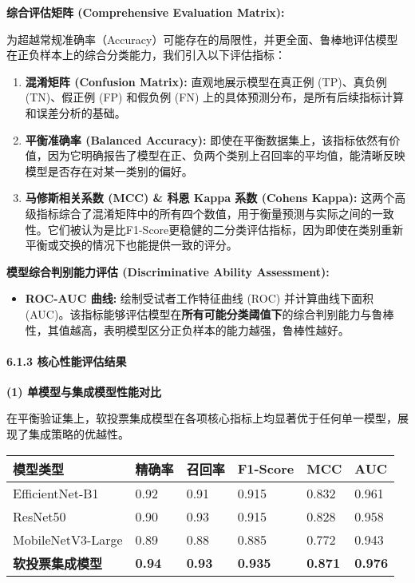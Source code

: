 \documentclass[
]{article}
\begin{document}
\textbf{综合评估矩阵 (Comprehensive Evaluation Matrix):}

为超越常规准确率（Accuracy）可能存在的局限性，并更全面、鲁棒地评估模型在正负样本上的综合分类能力，我们引入以下评估指标：

\begin{enumerate}
\def\labelenumi{\arabic{enumi}.}
\item
  \textbf{混淆矩阵 (Confusion Matrix):} 直观地展示模型在真正例
  (TP)、真负例 (TN)、假正例 (FP) 和假负例 (FN)
  上的具体预测分布，是所有后续指标计算和误差分析的基础。
\item
  \textbf{平衡准确率 (Balanced Accuracy):}
  即使在平衡数据集上，该指标依然有价值，因为它明确报告了模型在正、负两个类别上召回率的平均值，能清晰反映模型是否存在对某一类别的偏好。
\item
  \textbf{马修斯相关系数 (MCC) \& 科恩 Kappa 系数
  (Cohen\textquotesingle s Kappa):}
  这两个高级指标综合了混淆矩阵中的所有四个数值，用于衡量预测与实际之间的一致性。它们被认为是比F1-Score更稳健的二分类评估指标，因为即使在类别重新平衡或交换的情况下也能提供一致的评分。
\end{enumerate}

\textbf{模型综合判别能力评估 (Discriminative Ability Assessment):}

\begin{itemize}
\item
  \textbf{ROC-AUC 曲线:} 绘制受试者工作特征曲线 (ROC) 并计算曲线下面积
  (AUC)。该指标能够评估模型在\textbf{所有可能分类阈值下}的综合判别能力与鲁棒性，其值越高，表明模型区分正负样本的能力越强，鲁棒性越好。
\end{itemize}

\paragraph{\texorpdfstring{\textbf{6.1.3
核心性能评估结果}}{6.1.3 核心性能评估结果}}\label{613-ux6838ux5fc3ux6027ux80fdux8bc4ux4f30ux7ed3ux679c}

\textbf{(1) 单模型与集成模型性能对比}

在平衡验证集上，软投票集成模型在各项核心指标上均显著优于任何单一模型，展现了集成策略的优越性。

\begin{longtable}[]{@{}llllll@{}}
\toprule\noalign{}
模型类型 & 精确率 & 召回率 & \textbf{F1-Score} & \textbf{MCC} &
\textbf{AUC} \\
\midrule\noalign{}
\endhead
\bottomrule\noalign{}
\endlastfoot
EfficientNet-B1 & 0.92 & 0.91 & 0.915 & 0.832 & 0.961 \\
ResNet50 & 0.90 & 0.93 & 0.915 & 0.828 & 0.958 \\
MobileNetV3-Large & 0.89 & 0.88 & 0.885 & 0.772 & 0.943 \\
\textbf{软投票集成模型} & \textbf{0.94} & \textbf{0.93} & \textbf{0.935}
& \textbf{0.871} & \textbf{0.976} \\
\end{longtable}
\end{document}

